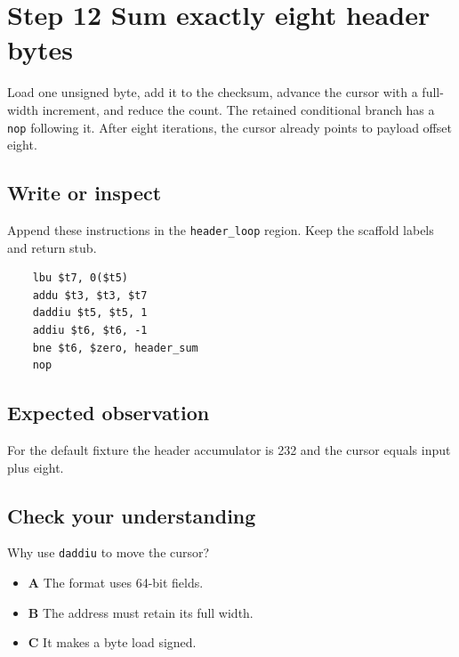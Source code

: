 \section{Step 12 Sum exactly eight header bytes}\label{packet-s12}

Load one unsigned byte, add it to the checksum, advance the cursor with a full-width increment, and reduce the count. The retained conditional branch has a \texttt{nop} following it. After eight iterations, the cursor already points to payload offset eight.

\subsection{Write or inspect}
Append these instructions in the \texttt{header\_loop} region. Keep the scaffold labels and return stub.

\begin{verbatim}
    lbu $t7, 0($t5)
    addu $t3, $t3, $t7
    daddiu $t5, $t5, 1
    addiu $t6, $t6, -1
    bne $t6, $zero, header_sum
    nop
\end{verbatim}

\subsection{Expected observation}
For the default fixture the header accumulator is 232 and the cursor equals input plus eight.

\subsection{Check your understanding}
Why use \texttt{daddiu} to move the cursor?

\begin{itemize}
  \item \textbf{A} The format uses 64-bit fields.
  \item \textbf{B} The address must retain its full width.
  \item \textbf{C} It makes a byte load signed.
\end{itemize}
